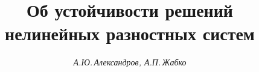 









\newcommand{\tg}{\operatorname{tg}}


\newcommand{\tts}[1]{}







\setcounter{page}{3}















\author{\it А.Ю.\,Александров, А.П.\,Жабко}




\title{Об устойчивости решений\\ нелинейных разностных систем}





\date{}




\pagestyle{plain} %







\maketitle


\label{begin}











